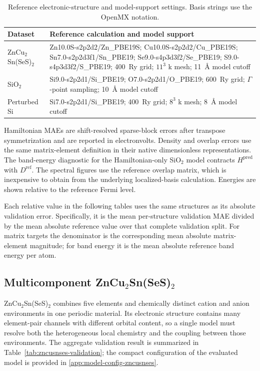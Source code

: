 \documentclass[preprint,12pt,compress,numafflabel]{elsarticle}
\begin{document}
\begin{table}[H]
\centering
\scriptsize
\caption{Reference electronic-structure and model-support settings. Basis strings use the OpenMX notation.}
\label{tab:reference-settings}
\begin{tabular}{p{}p{}}
\toprule
Dataset & Reference calculation and model support \\
\midrule
ZnCu$_2$Sn(SeS)$_2$ &
Zn10.0S-s2p2d2/Zn\_PBE19S; Cu10.0S-s2p2d2/Cu\_PBE19S; Sn7.0-s2p2d3f1/Sn\_PBE19; Se9.0-s4p3d3f2/Se\_PBE19; S9.0-s4p3d3f2/S\_PBE19; 400~Ry grid; $11^3$ k mesh; 11~\r{A} model cutoff \\
SiO$_2$ &
Si9.0-s2p2d1/Si\_PBE19; O7.0-s2p2d1/O\_PBE19; 600~Ry grid; $\Gamma$-point sampling; 10~\r{A} model cutoff \\
Perturbed Si &
Si7.0-s2p2d1/Si\_PBE19; 400~Ry grid; $8^3$ k mesh; 8~\r{A} model cutoff \\
\bottomrule
\end{tabular}
\end{table}

Hamiltonian MAEs are shift-resolved sparse-block errors after transpose symmetrization and are reported in electronvolts. Density and overlap errors use the same matrix-element definition in their native dimensionless representations. The band-energy diagnostic for the Hamiltonian-only SiO$_2$ model contracts $H^{\mathrm{pred}}$ with $D^{\mathrm{ref}}$. The spectral figures use the reference overlap matrix, which is inexpensive to obtain from the underlying localized-basis calculation. Energies are shown relative to the reference Fermi level.

Each relative value in the following tables uses the same structures as its absolute validation error. Specifically, it is the mean per-structure validation MAE divided by the mean absolute reference value over that complete validation split. For matrix targets the denominator is the corresponding mean absolute matrix-element magnitude; for band energy it is the mean absolute reference band energy per atom.


\subsection{Multicomponent ZnCu$_2$Sn(SeS)$_2$}

ZnCu$_2$Sn(SeS)$_2$ combines five elements and chemically distinct cation and anion environments in one periodic material.
Its electronic structure contains many element-pair channels with different orbital content, so a single model must resolve both the heterogeneous local chemistry and the coupling between those environments.
The aggregate validation result is summarized in Table~\ref{tab:zncusnses-validation}; the compact configuration of the evaluated model is provided in \ref{app:model-config-zncusnses}.
\end{document}
